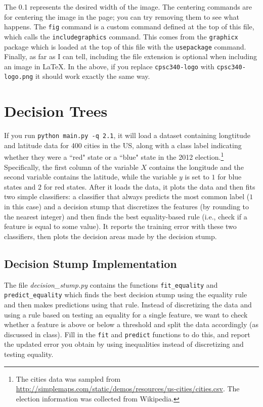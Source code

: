 \documentclass{article}
\def\blu#1{{\color{blu}#1}}
\begin{document}
The 0.1 represents the desired width of the image. The centering commands are for centering the image in the page; you can try removing them to see what happens. The \texttt{fig} command is a custom command defined at the top of this file, which calls the \texttt{includegraphics} command. This comes from the \texttt{graphicx} package which is loaded at the top of this file with the \texttt{usepackage} command. Finally, as far as I can tell, including the file extension is optional when including an image in LaTeX. In the above, if you replace \texttt{cpsc340-logo} with \texttt{cpsc340-logo.png} it should work exactly the same way.

\section{Decision Trees}

If you run \texttt{python main.py -q 2.1}, it will load a dataset containing longtitude and latitude data for 400 cities in the US, along with a class label indicating whether they were a ``red" state or a ``blue" state in the 2012 election.\footnote{The cities data was sampled from \url{http://simplemaps.com/static/demos/resources/us-cities/cities.csv}. The election information was collected from Wikipedia.}
Specifically, the first column of the variable $X$ contains the longitude and the second variable contains the latitude,
while the variable $y$ is set to $1$ for blue states and $2$ for red states.
After it loads the data, it plots the data and then fits two simple classifiers: a classifier that always predicts the
most common label ($1$ in this case) and a decision stump that discretizes the features (by rounding to the nearest integer)
and then finds the best equality-based rule (i.e., check if a feature is equal to some value).
It reports the training error with these two classifiers, then plots the decision areas made by the decision stump.

\subsection{Decision Stump Implementation}

The file \emph{decision\_stump.py} contains the functions \texttt{fit\string_equality} and \texttt{predict\string_equality} which finds the best decision stump using the equality rule and then makes predictions using that rule. Instead of discretizing the data and using a rule based on testing an equality for a single feature, we want to check whether a feature is above or below a threshold and split the data accordingly (as discussed in class). \blu{Fill in the \texttt{fit} and \texttt{predict} functions to do this, and report the updated error you obtain by using inequalities instead of discretizing and testing equality.}
\end{document}

